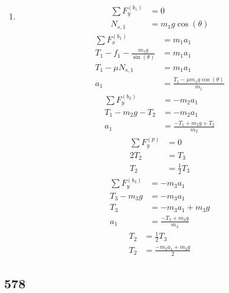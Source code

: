 \documentclass{article}
\begin{document}
\begin{enumerate}[label=\textbf{(\alph*)}]
	\item
		\begin{align*}
			\sum F_y^{(b_1)} & = 0 \\
			N_{s, 1} & = m_1g\cos(\theta)
		\end{align*}
		\begin{align*}
			\sum F_x^{(b_1)} & = m_1a_1 \\
			T_1 - f_1 - \frac{m_1g}{\sin(\theta)} & = m_1a_1 \\
			T_1 - \mu N_{s, 1} & = m_1a_1 \\
			a_1 & = \frac{T_1 - \mu m_1g\cos(\theta)}{m_1}
		\end{align*}
		\begin{align*}
			\sum F_y^{(b_2)} & = -m_2a_1 \\
			T_1 - m_2g - T_2 & = -m_2a_1 \\
			a_1 & = \frac{-T_1 + m_2g + T_2}{m_2}
		\end{align*}
		\begin{align*}
			\sum F_y^{(p)} & = 0 \\
			2T_2 & = T_3 \\
			T_2 & = \frac{1}{2}T_3
		\end{align*}
		\begin{align*}
			\sum F_y^{(b_3)} & = -m_3a_1 \\
			T_3 - m_3g & = -m_3a_1 \\
			T_3 & = -m_3a_1 + m_3g \\
			a_1 & = \frac{-T_3 + m_3g}{m_3}
		\end{align*}
		\begin{align*}
			T_2 & = \frac{1}{2}T_3 \\
			T_2 & = \frac{-m_3a_1 + m_3g}{2}
		\end{align*}
\end{enumerate}

\subsection{578}

\end{document}
